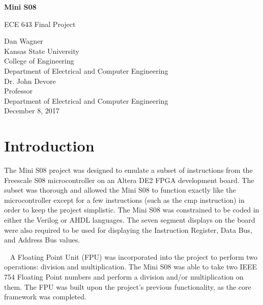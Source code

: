 \documentclass[letterpaper, 12pt]{article}
\begin{document}
\begin{titlepage}
\centering
	\vspace*{5.75cm}
	{\huge\bfseries Mini S08\par}
	{\large ECE 643 Final Project\par}
	\vspace{2cm}
	Dan Wagner\\
	Kansas State University\\
	College of Engineering\\
	Department of Electrical and Computer Engineering\\
	\vspace{1cm}
	Dr. John Devore\\
	Professor\\
	Department of Electrical and Computer Engineering\\
	\vspace{1cm}
	December 8, 2017
\end{titlepage}

\section*{Introduction}
\thispagestyle{plain}
The Mini S08 project was designed to emulate a subset of instructions from the Freescale S08 microcontroller on an Altera DE2 FPGA development board.  The subset was thorough and allowed the Mini S08 to function exactly like the microcontroller except for a few instructions (such as the cmp instruction) in order to keep the project simplistic.
The Mini S08 was constrained to be coded in either the Verilog or AHDL languages.  The seven segment displays on the board were also required to be used for displaying the Instruction Register, Data Bus, and Address Bus values.


~\newline
A Floating Point Unit (FPU) was incorporated into the project to perform two operations: division and multiplication.  The Mini S08 was able to take two IEEE 754 Floating Point numbers and perform a division and/or multiplication on them.  The FPU was built upon the project's previous functionality, as the core framework was completed.
\end{document}
